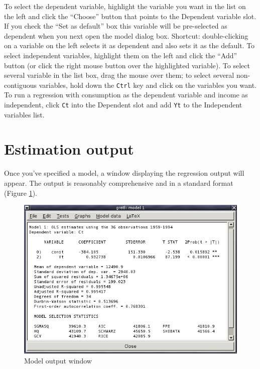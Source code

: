 To select the dependent variable, highlight the variable you want in
the list on the left and click the ``Choose'' button that points to
the Dependent variable slot.  If you check the ``Set as default'' box
this variable will be pre-selected as dependent when you next open the
model dialog box. Shortcut: double-clicking on a variable on the left
selects it as dependent and also sets it as the default. To select
independent variables, highlight them on the left and click the
``Add'' button (or click the right mouse button over the highlighted
variable).  To select several variable in the list box, drag the mouse
over them; to select several non-contiguous variables, hold down the
\verb+Ctrl+ key and click on the variables you want.  To run a
regression with consumption as the dependent variable and income as
independent, click \verb+Ct+ into the Dependent slot and add \verb+Yt+
to the Independent variables list.

\section{Estimation output}
\label{est-output}


Once you've specified a model, a window displaying the regression
output will appear.  The output is reasonably comprehensive and in a
standard format (Figure \ref{fig-modelwin}).
    
\begin{figure}[htbp]
  \caption{Model output window}
  \label{fig-modelwin}
  \begin{center}
    \includegraphics[scale=0.5]{figures/modelwin}
  \end{center}
\end{figure}


